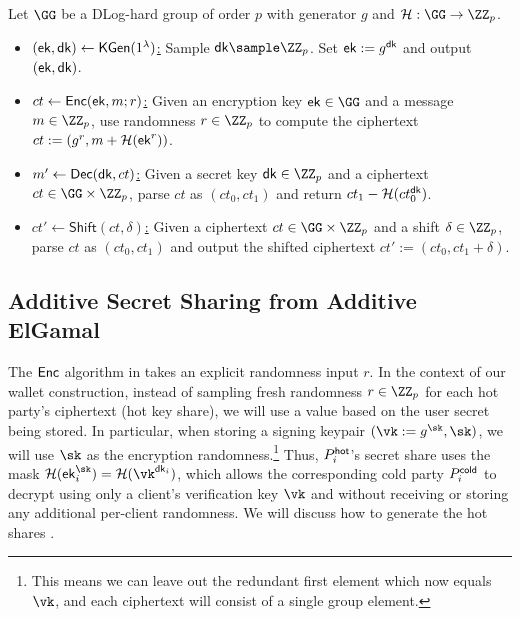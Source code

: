 \begin{construction}\label{con:additive_elgamal}
Let $\GG$ be a DLog-hard group of order $p$ with generator $g$ and $\lhlhash: \GG \rightarrow \ZZ_p$. 
\begin{itemize}
\item \underline{$(\mathsf{ek}, \mathsf{dk}) \gets \mathsf{KGen}(1^\lambda)$:}
Sample $\dk \sample \ZZ_p$. Set $\mathsf{ek} := g^{\mathsf{dk}}$ and output $(\mathsf{ek}, \mathsf{dk})$.

\item \underline{$ct \gets \mathsf{Enc}(\mathsf{ek}, m; r)$:}
Given an encryption key $\ek \in \GG$ and a message $m \in \ZZ_p$, use randomness $r \in \ZZ_p$ to compute the ciphertext $ct := (g^r, m + \mathcal{H}(\mathsf{ek}^r))$.

\item \underline{$m' \gets \mathsf{Dec}(\mathsf{dk}, ct)$:}
Given a secret key $\dk \in \ZZ_p$ and a ciphertext $ct \in \GG \times\ZZ_p$, parse $ct$ as $(ct_0, ct_1)$ and return $ct_1 - \mathcal{H}(ct_0^{\mathsf{dk}})$.

\item \underline{$ct' \gets \mathsf{Shift}(ct, \delta)$:}
Given a ciphertext $ct \in \GG \times \ZZ_p$ and a shift $\delta \in \ZZ_p$, parse $ct$ as $(ct_0, ct_1)$ and output the shifted ciphertext $ct' := (ct_0, ct_1 + \delta)$.
\end{itemize}
\end{construction}

\subsection{Additive Secret Sharing from Additive ElGamal}\label{sec:enc-lhl}

The $\mathsf{Enc}$ algorithm in  takes an explicit randomness input $r$. In the context of our wallet construction, instead of sampling fresh randomness $r \in \ZZ_p$ for each hot party's ciphertext (hot key share), we will use a value based on the user secret being stored. In particular, when storing a signing keypair $(\vk := g^{\sk}, \sk)$, we will use $\sk$ as the encryption randomness.\footnote{This means we can leave out the redundant first element which now equals $\vk$, and each ciphertext will consist of a single group element.} Thus, $P_i^{\mathsf{hot}}$'s secret share uses the mask $\lhlhash(\ek_i^{\sk}) = \lhlhash(\vk^{\dk_i})$, which allows the corresponding cold party $P_i^{\mathsf{cold}}$ to decrypt using only a client's verification key $\vk$ and without receiving or storing any additional per-client randomness. We will discuss how to generate the hot shares .

